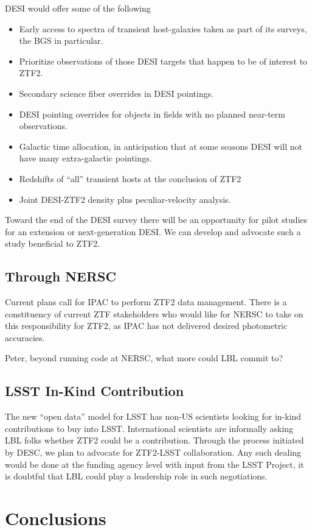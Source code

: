 \documentclass[11pt, oneside]{article}   	%
\begin{document}
DESI would offer some of the following
\begin{itemize}
\item Early access to spectra of transient host-galaxies taken as part of its surveys, the BGS in particular.
\item Prioritize observations of those DESI  targets that happen to be of interest to ZTF2.
\item Secondary science fiber overrides in DESI pointings.
\item DESI pointing overrides for objects in fields with no planned near-term observations.
\item Galactic time allocation, in anticipation that at some seasons DESI will not have many extra-galactic pointings.
\item Redshifts of ``all'' transient hosts at the conclusion of ZTF2
\item Joint DESI-ZTF2 density plus peculiar-velocity analysis.
\end{itemize}

Toward the end of the DESI survey there will be an opportunity for pilot studies for an extension or next-generation DESI.  
We can develop and advocate such a study beneficial to ZTF2.

\subsection{Through NERSC}
Current plans call for IPAC to perform ZTF2 data management. There is a constituency of current ZTF stakeholders who
would like for NERSC to take on this responsibility for ZTF2, as IPAC has not delivered desired photometric accuracies.

Peter, beyond running code at NERSC, what more could LBL commit to? 


\subsection{LSST In-Kind Contribution}
The new ``open data'' model for LSST has non-US scientists looking for in-kind contributions to buy into
LSST.  International scientists are informally asking LBL folks  whether  ZTF2 could be a contribution.
Through the process initiated by DESC, we plan to advocate for ZTF2-LSST collaboration.
Any such dealing would be done at the funding agency level with input from the LSST Project,
it is doubtful that LBL could play a leadership role in such negotiations.


\section{Conclusions}
\end{document}
